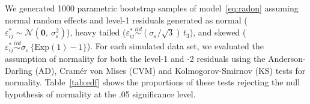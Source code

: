 \documentclass[12pt]{article} %
\newcommand{\citetapos}[1]{\citeauthor{#1}{\textcolor{blue}{'s}} }
\newcommand{\hh}[1]{{\color{orange} #1}}
\newcommand{\al}[1]{{\color{red} #1}}
\begin{document}
%
We generated 1000 parametric bootstrap samples of model~\eqref{eq:radon} assuming normal random effects and level-1 residuals generated as normal ($\varepsilon_{ij}^* \sim \mathcal{N}(\bm{0},\ \sigma^2_\varepsilon)$), heavy tailed ($\varepsilon_{ij}^* \overset{iid}{\sim} (\sigma_{\varepsilon} / \sqrt{3})\, t_3$), and skewed ($\varepsilon_{ij}^* \overset{iid}{\sim} \sigma_{\varepsilon} \, \{ \text{Exp}(1) - 1 \}$).
For each simulated data set, we evaluated the assumption of normality for both the level-1 and -2 residuals using the Anderson-Darling (AD), Cram{\'e}r von Mises (CVM) and  Kolmogorov-Smirnov (KS) tests for normality.  
Table~\ref{tab:edf} shows the proportions of these tests rejecting the null hypothesis of normality at the .05 significance level. 
\end{document}
